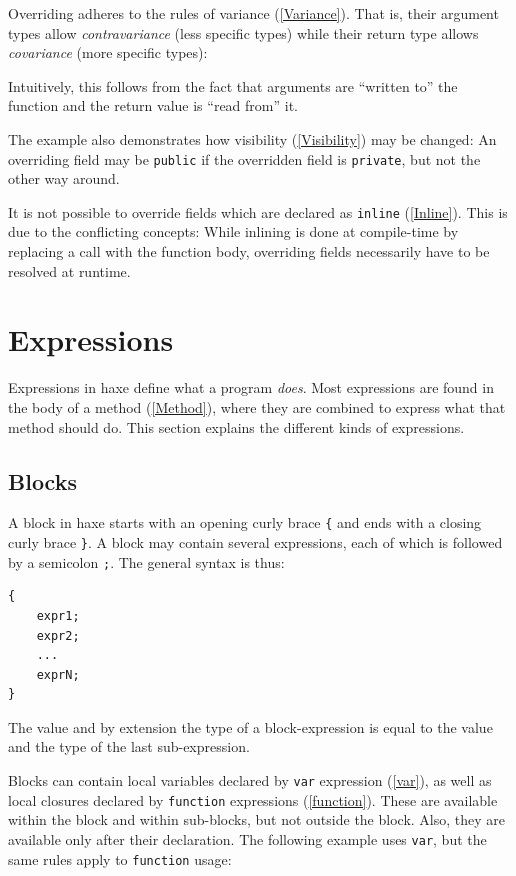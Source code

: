 \documentclass{article}
\newcommand{\expr}[1]{\texttt{#1}}
\newcommand{\tref}[2]{#1 (\ref{#2})}
\begin{document}
Overriding adheres to the rules of \tref{variance}{Variance}. That is, their argument types allow \emph{contravariance} (less specific types) while their return type allows \emph{covariance} (more specific types):



Intuitively, this follows from the fact that arguments are ``written to'' the function and the return value is ``read from'' it.

The example also demonstrates how \tref{visibility}{Visibility} may be changed: An overriding field may be \expr{public} if the overridden field is \expr{private}, but not the other way around.

It is not possible to override fields which are declared as \tref{\expr{inline}}{Inline}. This is due to the conflicting concepts: While inlining is done at compile-time by replacing a call with the function body, overriding fields necessarily have to be resolved at runtime.


\section{Expressions}
\label{Expressions}

Expressions in haxe define what a program \emph{does}. Most expressions are found in the body of a \tref{method}{Method}, where they are combined to express what that method should do. This section explains the different kinds of expressions.



\subsection{Blocks}

A block in haxe starts with an opening curly brace \expr{\{} and ends with a closing curly brace \expr{\}}. A block may contain several expressions, each of which is followed by a semicolon \expr{;}. The general syntax is thus:

\begin{lstlisting}
{
	expr1;
	expr2;
	...
	exprN;
}
\end{lstlisting}
The value and by extension the type of a block-expression is equal to the value and the type of the last sub-expression.

Blocks can contain local variables declared by \tref{\expr{var} expression}{var}, as well as local closures declared by \tref{\expr{function} expressions}{function}. These are available within the block and within sub-blocks, but not outside the block. Also, they are available only after their declaration. The following example uses \expr{var}, but the same rules apply to \expr{function} usage:
\end{document}

